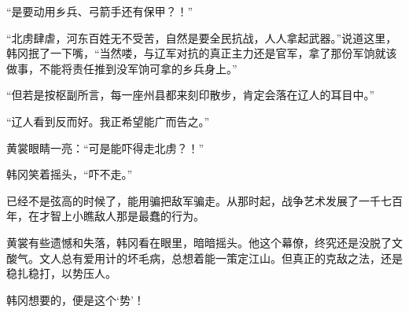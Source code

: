 “是要动用乡兵、弓箭手还有保甲？！”

“北虏肆虐，河东百姓无不受苦，自然是要全民抗战，人人拿起武器。”说道这里，韩冈抿了一下嘴，“当然喽，与辽军对抗的真正主力还是官军，拿了那份军饷就该做事，不能将责任推到没军饷可拿的乡兵身上。”

“但若是按枢副所言，每一座州县都来刻印散步，肯定会落在辽人的耳目中。”

“辽人看到反而好。我正希望能广而告之。”

黄裳眼睛一亮：“可是能吓得走北虏？！”

韩冈笑着摇头，“吓不走。”

已经不是弦高的时候了，能用骗把敌军骗走。从那时起，战争艺术发展了一千七百年，在才智上小瞧敌人那是最蠢的行为。

黄裳有些遗憾和失落，韩冈看在眼里，暗暗摇头。他这个幕僚，终究还是没脱了文酸气。文人总有爱用计的坏毛病，总想着能一策定江山。但真正的克敌之法，还是稳扎稳打，以势压人。

韩冈想要的，便是这个‘势’！

